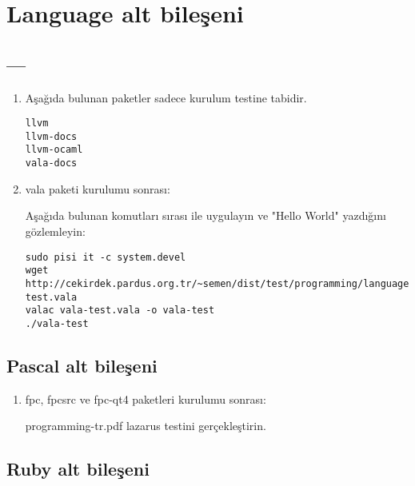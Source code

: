 \documentclass[a4paper,10pt]{article}
\begin{document}
\section{Language alt bileşeni}

\subsection{---}
\begin{enumerate}
\item Aşağıda bulunan paketler sadece kurulum testine tabidir.

\begin{verbatim}
llvm
llvm-docs
llvm-ocaml
vala-docs
\end{verbatim}

\item vala paketi kurulumu sonrası:

Aşağıda bulunan komutları sırası ile uygulayın ve "Hello World" yazdığını gözlemleyin:  

\begin{verbatim}
sudo pisi it -c system.devel
wget http://cekirdek.pardus.org.tr/~semen/dist/test/programming/language/vala-test.vala
valac vala-test.vala -o vala-test
./vala-test
\end{verbatim}

 
\end{enumerate}

\subsection{Pascal alt bileşeni}

\begin{enumerate}
 \item fpc, fpcsrc ve fpc-qt4 paketleri kurulumu sonrası:

programming-tr.pdf lazarus testini gerçekleştirin.
\end{enumerate}


\subsection{Ruby alt bileşeni}
\end{document}
